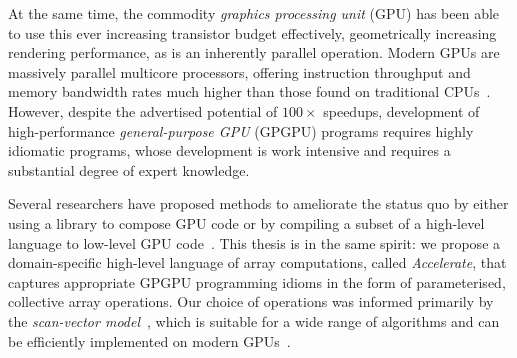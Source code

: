 At the same time, the commodity \emph{graphics processing unit} (GPU)\gpu{} has
been able to use this ever increasing transistor budget effectively,
geometrically increasing rendering performance, as  is
an inherently parallel operation.
%
%
Modern GPUs are massively parallel multicore processors, offering instruction
throughput and memory bandwidth rates much higher than those found on
traditional CPUs~\cite{NVIDIA:2012wf}. However, despite the advertised potential
of $100\times$ speedups, development of high-performance \emph{general-purpose
GPU} (GPGPU)\gpgpu{} programs requires highly idiomatic programs, whose
development is work intensive and requires a substantial degree of expert
knowledge.

Several researchers have proposed methods to ameliorate the status quo by either
using a library to compose GPU\gpu{} code or by compiling a subset of a
high-level language to low-level GPU
code~\cite{McCool:2004,Bond:2010bd,ThrustAParallelT:ub,Catanzaro:2011cn,Mainland:2010vj,CLyther:EvXSiruK,Muranushi:2012eh}.
This thesis is in the same spirit: we propose a domain-specific high-level
language of array computations, called \emph{Accelerate}, that captures
appropriate GPGPU\gpgpu{} programming idioms in the form of parameterised,
collective array operations. Our choice of operations was informed primarily by
the \emph{scan-vector model}~\cite{Chatterjee:1990vj}, which is suitable for a
wide range of algorithms and can be efficiently implemented on modern
GPUs~\cite{Sengupta:2007tc}.

